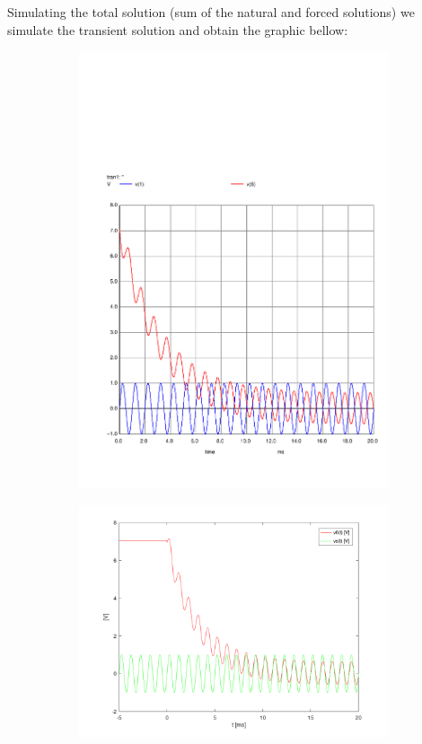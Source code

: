 Simulating the total solution (sum of the natural and forced solutions) we simulate the transient solution and obtain the graphic bellow:
\begin{figure}[h]
  \centering
  \begin{subfigure}{0.23\textwidth}
    \includegraphics[width=\linewidth, clip]{../sim/trans4.pdf}
    \label{fig:PStime}
  \end{subfigure}
  \begin{subfigure}{0.23\textwidth}
    \includegraphics[width=\linewidth, clip]{../mat/total.png}
    \label{fig:PSciclo}
  \end{subfigure}


\end{figure}
